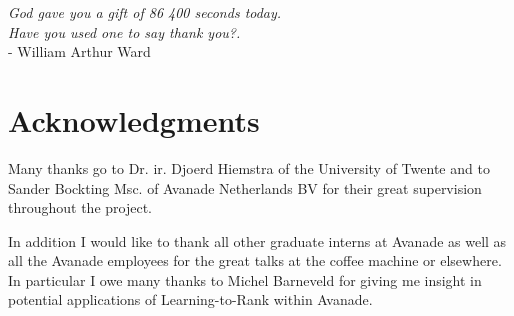 
\begin{flushright}{\slshape    
   God gave you a gift of 86 400 seconds today. \\
   Have you used one to say thank you?.} \\ \medskip
   - William Arthur Ward
\end{flushright}



\bigskip

\begingroup
\let\clearpage\relax
\let\cleardoublepage\relax
\let\cleardoublepage\relax
\chapter*{Acknowledgments}
Many thanks go to Dr. ir. Djoerd Hiemstra of the University of Twente and to Sander Bockting Msc. of Avanade Netherlands BV for their great supervision throughout the project.

In addition I would like to thank all other graduate interns at Avanade as well as all the Avanade employees for the great talks at the coffee machine or elsewhere. In particular I owe many thanks to Michel Barneveld for giving me insight in potential applications of Learning-to-Rank within Avanade.

\endgroup



